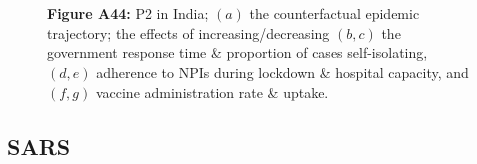 \documentclass[paper=a4,fontsize=11pt]{article}
\begin{document}
\begin{figure}[!h]
  \\
  \hspace{1.76cm}
  \\
  \caption*{\textbf{Figure A44:} P2 in India; $(a)$ the counterfactual epidemic trajectory; the effects of increasing/decreasing $(b,c)$ the government response time \& proportion of cases self-isolating, $(d,e)$ adherence to NPIs during lockdown \& hospital capacity, and $(f,g)$ vaccine administration rate \& uptake.}
\end{figure}


\subsection{SARS}
\end{document}
